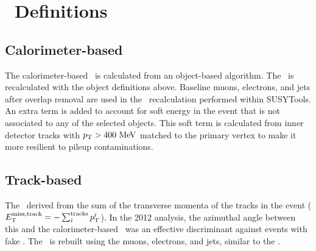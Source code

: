 \section{\met\ Definitions} 
\label{sec:Selection_MET}

\subsection{\boldmath Calorimeter-based \met}

The calorimeter-based \met\ is calculated from an object-based algorithm. The \met\ is recalculated with the object definitions above. Baseline muons, electrons, and jets after overlap removal are used in the \met\ recalculation performed within SUSYTools. An extra term is added to account for soft energy in the event that is not associated to any of the selected objects. This soft term is calculated from inner detector tracks with $\pT > 400 \MeV$ matched to the primary vertex to make it more resilient to pileup contaminations.




\subsection{\boldmath Track-based \MET}

The \MET\ derived from the sum of the transverse momenta of the tracks in the event ($E_{\mathrm{T}}^{\mathrm{miss, track}} = -\sum_i^{\mathrm{tracks}}p_{\mathrm{T}}^i$). In the 2012 analysis, the azimuthal angle between this and the calorimeter-based \MET\ was an effective discriminant against events with fake \MET. The \mettrk\ is rebuilt using the muons, electrons, and jets, similar to the \met.

